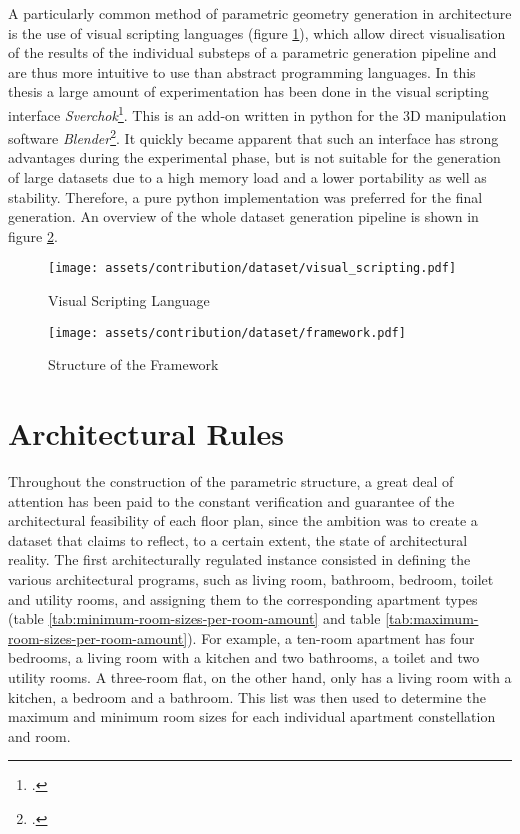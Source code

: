 \documentclass[a4paper, 12pt]{report}
\begin{document}
A particularly common method of parametric geometry generation in architecture is the use of visual scripting languages (figure \ref{fig:visual-scripting-language}), which allow direct visualisation of the results of the individual substeps of a parametric generation pipeline and are thus more intuitive to use than abstract programming languages. In this thesis a large amount of experimentation has been done in the visual scripting interface \textit{Sverchok}\footcite{sverchok2013}. This is an add-on written in \Gls{python} for the 3D manipulation software \textit{Blender}\footcite{blender}. It quickly became apparent that such an interface has strong advantages during the experimental phase, but is not suitable for the generation of large datasets due to a high memory load and a lower portability as well as stability. Therefore, a pure \Gls{python} implementation was preferred for the final generation. An overview of the whole dataset generation pipeline is shown in figure \ref{fig:flow-diagram-of-the-framework}.

\begin{figure}
\centering
\texttt{[image: assets/contribution/dataset/visual\_scripting.pdf]}
\caption{Visual Scripting Language}
\label{fig:visual-scripting-language}
\end{figure}

\begin{figure}
\centering
\texttt{[image: assets/contribution/dataset/framework.pdf]}
\caption{Structure of the Framework}
\label{fig:flow-diagram-of-the-framework}
\end{figure}

\section{Architectural Rules}\label{sec:architectural-rules}

Throughout the construction of the parametric structure, a great deal of attention has been paid to the constant verification and guarantee of the architectural feasibility of each floor plan, since the ambition was to create a dataset that claims to reflect, to a certain extent, the state of architectural reality. The first architecturally regulated instance consisted in defining the various architectural programs, such as living room, bathroom, bedroom, toilet and utility rooms, and assigning them to the corresponding apartment types (table \ref{tab:minimum-room-sizes-per-room-amount} and table \ref{tab:maximum-room-sizes-per-room-amount}). For example, a ten-room apartment has four bedrooms, a living room with a kitchen and two bathrooms, a toilet and two utility rooms. A three-room flat, on the other hand, only has a living room with a kitchen, a bedroom and a bathroom. This list was then used to determine the maximum and minimum room sizes for each individual apartment constellation and room.
\end{document}
